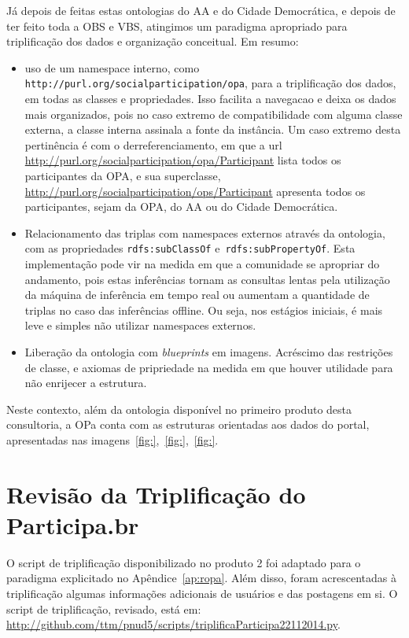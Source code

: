 \documentclass[12pt]{article}
\begin{document}
Já depois de feitas estas ontologias do AA e do Cidade Democrática, e depois de ter feito toda a OBS e VBS, atingimos um paradigma apropriado para triplificação dos dados e organização conceitual. Em resumo:
\begin{itemize}
    \item uso de um namespace interno, como \texttt{http://purl.org/socialparticipation/opa}, para a triplificação dos dados, em todas as classes e propriedades. Isso facilita a navegacao e deixa os dados mais organizados, pois no caso extremo de compatibilidade com alguma classe externa, a classe interna assinala a fonte da instância. Um caso extremo desta pertinência é com o derreferenciamento, em que a url \url{http://purl.org/socialparticipation/opa/Participant} lista todos os participantes da OPA, e sua superclasse, \url{http://purl.org/socialparticipation/ops/Participant} apresenta todos os participantes, sejam da OPA, do AA ou do Cidade Democrática.
    \item Relacionamento das triplas com namespaces externos através da ontologia, com as propriedades \texttt{rdfs:subClassOf} e~\texttt{rdfs:subPropertyOf}. Esta implementação pode vir na medida em que a comunidade se apropriar do andamento, pois estas inferências tornam as consultas lentas pela utilização da máquina de inferência em tempo real ou aumentam a quantidade de triplas no caso das inferências offline. Ou seja, nos estágios iniciais, é mais leve e simples não utilizar namespaces externos.
    \item Liberação da ontologia com \emph{blueprints} em imagens. Acréscimo das restrições de classe, e axiomas de pripriedade na medida em que houver utilidade para não enrijecer a estrutura.
\end{itemize}

Neste contexto, além da ontologia disponível no primeiro produto desta consultoria, a OPa conta com as estruturas orientadas aos dados do portal, apresentadas nas imagens~\ref{fig:},~\ref{fig:},~\ref{fig:}.

\section{Revisão da Triplificação do Participa.br}
O script de triplificação disponibilizado no produto 2 foi adaptado para o paradigma explicitado no Apêndice~\ref{ap:ropa}. Além disso,
foram acrescentadas à triplificação algumas informações adicionais de usuários e das postagens em si. O script de triplificação, revisado, está em: \url{http://github.com/ttm/pnud5/scripts/triplificaParticipa22112014.py}.
\end{document}
